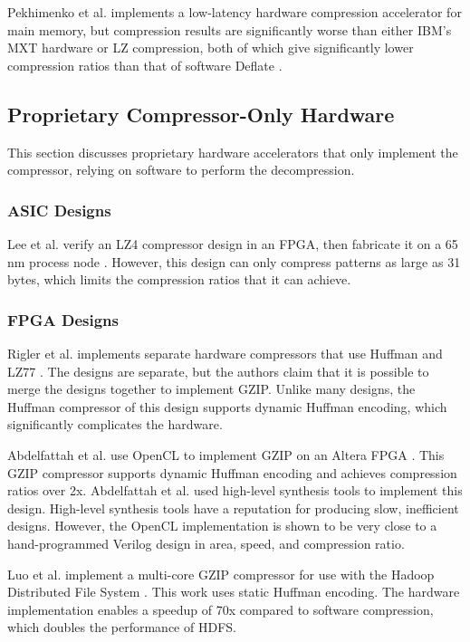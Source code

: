\documentclass[doublespace,nopageskip]{VTthesis}
\begin{document}
Pekhimenko et al. implements a low-latency hardware compression accelerator for main memory, but compression results are significantly worse than either IBM's MXT hardware or LZ compression, both of which give significantly lower compression ratios than that of software Deflate \cite{linearcompression}.

\subsection{Proprietary Compressor-Only Hardware}\label{proprietary_compressor-only_hardware}
This section discusses proprietary hardware accelerators that only implement the compressor, relying on software to perform the decompression.

\subsubsection{ASIC Designs}\label{sss:asic_compressor_designs}
Lee et al. verify an LZ4 compressor design in an FPGA, then fabricate it on a 65 nm process node \cite{hardwarelz4}. However, this design can only compress patterns as large as 31 bytes, which limits the compression ratios that it can achieve.

\subsubsection{FPGA Designs}\label{sss:fpga_compressor_designs}
Rigler et al. implements separate hardware compressors that use Huffman and LZ77 \cite{fpgahuffmanlz77}. The designs are separate, but the authors claim that it is possible to merge the designs together to implement GZIP. Unlike many designs, the Huffman compressor of this design supports dynamic Huffman encoding, which significantly complicates the hardware.

Abdelfattah et al. use OpenCL to implement GZIP on an Altera FPGA \cite{gziponachip}. This GZIP compressor supports dynamic Huffman encoding and achieves compression ratios over 2x. Abdelfattah et al. used high-level synthesis tools to implement this design. High-level synthesis tools have a reputation for producing slow, inefficient designs. However, the OpenCL implementation is shown to be very close to a hand-programmed Verilog design in area, speed, and compression ratio.

Luo et al. implement a multi-core GZIP compressor for use with the Hadoop Distributed File System \cite{hdfsgzip}. This work uses static Huffman encoding. The hardware implementation enables a speedup of 70x compared to software compression, which doubles the performance of HDFS.
\end{document}
